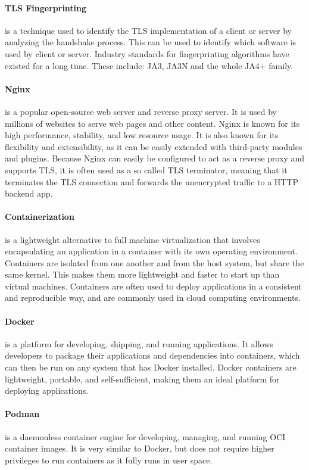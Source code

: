 \documentclass[12pt]{scrbook}
\begin{document}
\paragraph{TLS Fingerprinting} is a technique used to identify the TLS
implementation of a client or server by analyzing the handshake process. This
can be used to identify which software is
used by client or server. Industry standards for fingerprinting algorithms have
existed for a long time. These include: JA3, JA3N and the whole JA4+ family.

\paragraph{Nginx} is a popular open-source web server and reverse proxy server.
It is
used by millions of websites to serve web pages and other content. Nginx is
known for its high performance, stability, and low resource usage. It is also
known for its flexibility and extensibility, as it can be easily extended with
third-party modules and plugins. Because Nginx can easily be configured to act
as a reverse proxy and supports TLS, it is often used as a so called TLS
terminator, meaning that it terminates the TLS connection and forwards the
unencrypted traffic to a HTTP backend app.

\paragraph{Containerization}
is a lightweight alternative to full machine virtualization that involves
encapsulating an application in a container with its own operating environment.
Containers are isolated from one another and from the host system, but share the
same kernel. This makes them more lightweight and faster to start up than
virtual machines. Containers are often used to deploy applications in a
consistent and reproducible way, and are commonly used in cloud computing
environments.

\paragraph{Docker} is a platform for
developing, shipping, and running applications. It allows developers to package
their applications and dependencies into containers, which can then be run on
any system that has Docker installed. Docker containers are lightweight,
portable, and self-sufficient, making them an ideal platform for deploying
applications.

\paragraph{Podman} is a daemonless container engine for developing, managing,
and running OCI container images. It is very similar to Docker, but does not
require higher privileges to run containers as it fully runs in user space.
\end{document}
